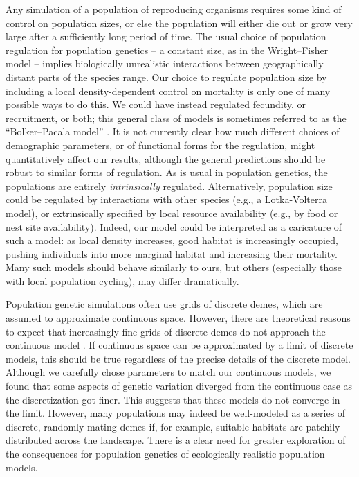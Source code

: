 \documentclass[10pt,twoside,lineno,hidelinks]{preprint}
\begin{document}
Any simulation of a population of reproducing organisms
requires some kind of control on population sizes,
or else the population will either die out or grow very large after a sufficiently long period of time. 
The usual choice of population regulation for population genetics --
a constant size, as in the Wright--Fisher model --
implies biologically unrealistic interactions between geographically distant parts of the species range.
Our choice to regulate population size by including a local density-dependent control on mortality
is only one of many possible ways to do this.
We could have instead regulated fecundity, or recruitment, or both;
this general class of models
is sometimes referred to as the ``Bolker--Pacala model'' \citep{bolker1997using}.
It is not currently clear how much different choices of demographic parameters,
or of functional forms for the regulation,
might quantitatively affect our results,
although the general predictions should be robust to similar forms of regulation.
As is usual in population genetics, 
the populations are entirely \emph{intrinsically} regulated.
Alternatively, population size could be regulated by interactions with other species
(e.g., a Lotka-Volterra model),
or extrinsically specified by local resource availability
(e.g., by food or nest site availability).
Indeed, our model could be interpreted as a caricature of such a model:
as local density increases, good habitat is increasingly occupied,
pushing individuals into more marginal habitat and increasing their mortality. 
Many such models should behave similarly to ours,
but others (especially those with local population cycling), may differ dramatically.

Population genetic simulations often use grids of discrete demes, which are assumed to approximate continuous space. 
However, there are theoretical reasons to expect that increasingly fine grids of discrete demes do not approach the continuous model 
\citep{barton2002neutral}.
If continuous space can be approximated by a limit of discrete models, this should be true regardless of the precise details of the discrete model. 
Although we carefully chose parameters to match our continuous models, we found that some aspects of genetic variation
diverged from the continuous case as the discretization got finer. 
This suggests that these models do not converge in the limit. 
However, many populations may indeed be well-modeled as a series of discrete, 
randomly-mating demes if, for example, suitable habitats are 
patchily distributed across the landscape. 
There is a clear need for greater exploration of 
the consequences for population genetics of ecologically realistic population models.
\end{document}
